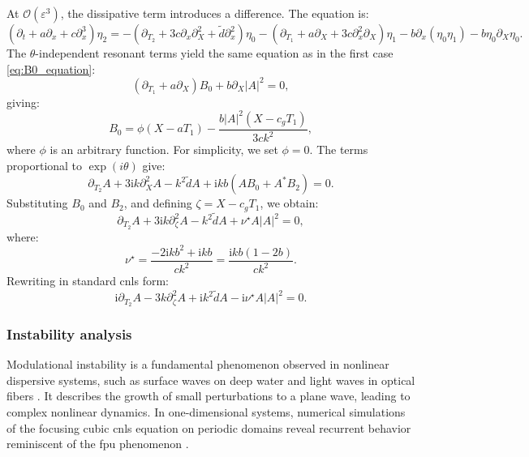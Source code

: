 \documentclass[alpha-refs, 12pt]{wiley-article}
\renewcommand{\O}{\mathcal{O}}
\newcommand{\ui}{\mathrm{i}}
\newcommand{\eps}{\varepsilon}
\begin{document}
At $\O(\eps^3)$, the dissipative term introduces a difference. The equation is:
\begin{equation}\label{eq:third_order_intermediate}
  \left( \partial_t + a \partial_x + c \partial_x^3 \right) \eta_2 = - \left( \partial_{T_2} + 3 c \partial_x \partial_X^2 + \tilde{d} \partial_x^2 \right) \eta_0 - \left( \partial_{T_1} + a \partial_X + 3 c \partial_x^2 \partial_X \right) \eta_1 - b \partial_x ( \eta_0 \eta_1 ) - b \eta_0 \partial_X \eta_0.
\end{equation}
The $\theta$-independent resonant terms yield the same equation as in the first case \eqref{eq:B0_equation}:
\[
  \left( \partial_{T_1} + a \partial_X \right) B_0 + b \partial_X |A|^2 = 0,
\]
giving:
\[
  B_0 = \phi(X - a T_1) - \frac{b |A|^2 (X - c_g T_1)}{3 c k^2},
\]
where $\phi$ is an arbitrary function. For simplicity, we set $\phi = 0$. The terms proportional to $\exp(i \theta)$ give:
\begin{equation}\label{eq:resonant_theta_intermediate}
  \partial_{T_2} A + 3 \ui k \partial_X^2 A - k^2 \tilde{d} A + \ui k b \left( A B_0 + A^* B_2 \right) = 0.
\end{equation}
Substituting $B_0$ and $B_2$, and defining $\zeta = X - c_g T_1$, we obtain:
\begin{equation*}%
  \partial_{T_2} A + 3 \ui k \partial_\zeta^2 A - k^2 \tilde{d} A + \nu^\star A |A|^2 = 0,
\end{equation*}
where:
\[
  \nu^\star = \frac{-2 \ui k b^2 + \ui k b}{c k^2} = \frac{\ui k b (1 - 2 b)}{c k^2}.
\]
Rewriting in standard \acrshort{cnls} form:
\begin{equation}\label{eq:NLS_final_intermediate}
  \ui \partial_{T_2} A - 3 k \partial_\zeta^2 A + \ui k^2 \tilde{d} A - \ui \nu^\star A |A|^2 = 0.
\end{equation}

\subsubsection{Instability analysis}

Modulational instability is a fundamental phenomenon observed in nonlinear dispersive systems, such as surface waves on deep water \cite{Benjamin1967a, Yuen1975, Yuen1980, Remoissenet1996} and light waves in optical fibers \cite{Tai1986}. It describes the growth of small perturbations to a plane wave, leading to complex nonlinear dynamics. In one-dimensional systems, numerical simulations of the focusing cubic \acrfull{cnls} equation on periodic domains reveal recurrent behavior reminiscent of the \acrfull{fpu} phenomenon \cite{Fermi1955, Yuen1978, Hafizi1981}.
\end{document}
